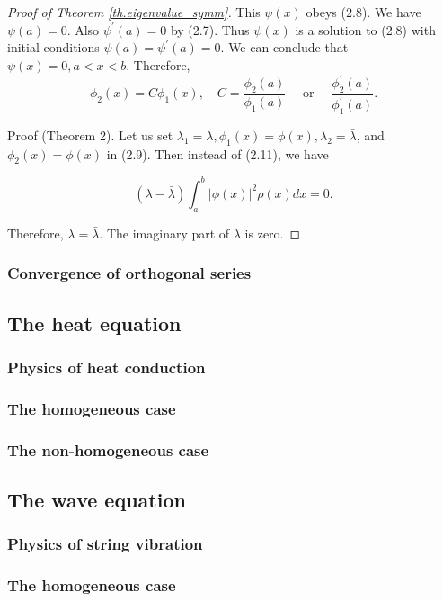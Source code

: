 \begin{proof}[Proof of Theorem \ref{th.eigenvalue_symm}]
This $\psi(x)$ obeys (2.8). We have $\psi(a)=0$. Also $\psi^{\prime}(a)=0$ by (2.7). Thus $\psi(x)$ is a solution to (2.8) with initial conditions $\psi(a)=\psi^{\prime}(a)=0$. We can conclude that $\psi(x)=0, a<x<b$. Therefore,
$$
\phi_2(x)=C \phi_1(x), \quad C=\frac{\phi_2(a)}{\phi_1(a)} \quad \text { or } \quad \frac{\phi_2^{\prime}(a)}{\phi_1^{\prime}(a)} .
$$

Proof (Theorem 2). Let us set $\lambda_1=\lambda, \phi_1(x)=\phi(x), \lambda_2=\bar{\lambda}$, and $\phi_2(x)=\bar{\phi}(x)$ in (2.9). Then instead of (2.11), we have

$$
(\lambda-\bar{\lambda}) \int_a^b|\phi(x)|^2 \rho(x) d x=0 .
$$

Therefore, $\lambda=\bar{\lambda}$. The imaginary part of $\lambda$ is zero.
\end{proof}

\subsubsection{Convergence of orthogonal series}

\subsection{The heat equation}

\subsubsection{Physics of heat conduction}

\subsubsection{The homogeneous case}

\subsubsection{The non-homogeneous case}

\subsection{The wave equation}

\subsubsection{Physics of string vibration}

\subsubsection{The homogeneous case}

